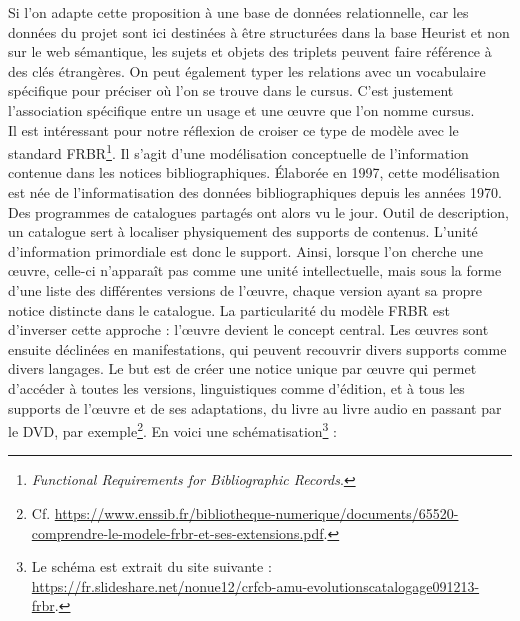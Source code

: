 \documentclass[a4paper,12pt,twoside]{book}
\begin{document}
	Si l'on adapte cette proposition à une base de données relationnelle, car les données du projet sont ici destinées à être structurées dans la base Heurist et non sur le web sémantique, les sujets et objets des triplets peuvent faire référence à des clés étrangères. On peut également typer les relations avec un vocabulaire spécifique pour préciser où l’on se trouve dans le cursus. C'est justement l'association spécifique entre un usage et une œuvre que l'on nomme cursus.\\
	
	Il est intéressant pour notre réflexion de croiser ce type de modèle avec le standard FRBR\footnote{\textit{Functional Requirements for Bibliographic Records}.}. Il s’agit d’une modélisation conceptuelle de l'information contenue dans les notices bibliographiques. Élaborée en 1997, cette modélisation est née de l'informatisation des données bibliographiques depuis les années 1970. Des programmes de catalogues partagés ont alors vu le jour. Outil de description, un catalogue sert à localiser physiquement des supports de contenus. L’unité d’information primordiale est donc le support. Ainsi, lorsque l’on cherche une œuvre, celle-ci n’apparaît pas comme une unité intellectuelle, mais sous la forme d’une liste des différentes versions de l’œuvre, chaque version ayant sa propre notice distincte dans le catalogue. La particularité du modèle FRBR est d'inverser cette approche : l’œuvre devient le concept central. Les œuvres sont ensuite déclinées en manifestations, qui peuvent recouvrir divers supports comme divers langages. Le but est de créer une notice unique par œuvre qui permet d’accéder à toutes les versions, linguistiques comme d'édition, et à tous les supports de l’œuvre et de ses adaptations, du livre au livre audio en passant par le DVD, par exemple\footnote{Cf. \url{https://www.enssib.fr/bibliotheque-numerique/documents/65520-comprendre-le-modele-frbr-et-ses-extensions.pdf}.}. En voici une schématisation\footnote{Le schéma est extrait du site suivante : \url{https://fr.slideshare.net/nonue12/crfcb-amu-evolutionscatalogage091213-frbr}.} : 
	
\end{document}
